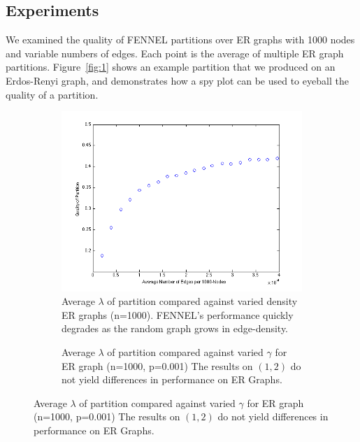 \documentclass[11pt]{article}
\begin{document}
\subsection*{Experiments} \vspace{-10 pt}
We examined the quality of FENNEL partitions over ER graphs with 1000 nodes and variable numbers of edges. Each point is the average of multiple ER graph partitions. Figure~\ref{fig:1} shows an example partition that we produced on an Erdos-Renyi graph, and demonstrates how a spy plot can be used to eyeball the quality of a partition.

\begin{figure}[ht]
\caption{FENNEL experiments investigating partition quality versus graph density and parameter choice.} 
\begin{subfigure}[b]{0.5\textwidth}
\caption{Average $\lambda$ of partition compared against varied density ER graphs (n=1000).  FENNEL's performance quickly degrades as the random graph grows in edge-density.}
\label{figure:quality}
\centering
\includegraphics[width=\textwidth] {figures/varied_er_p.png}
\end{subfigure}
\begin{subfigure}[b]{0.5\textwidth}
\caption{Average $\lambda$ of partition compared against varied $\gamma$ for ER graph (n=1000, p=0.001)  The results on $(1,2)$ do not yield differences in performance on ER Graphs.}
\label{figure:gamma}

\end{subfigure}
\end{figure}
\end{document}

